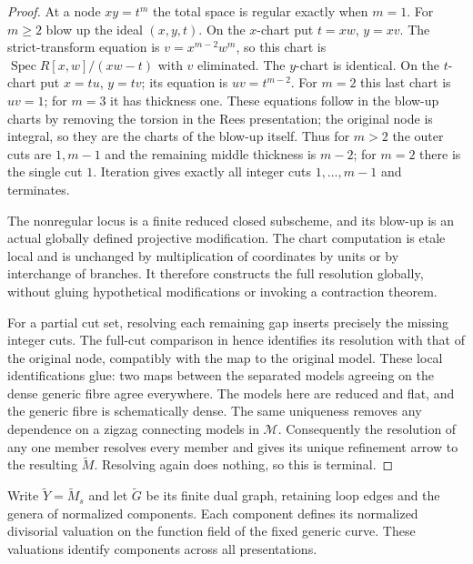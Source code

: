\documentclass[11pt]{article}
\theoremstyle{definition}
\theoremstyle{remark}
\begin{document}
\begin{proof}
At a node $xy=t^m$ the total space is regular exactly when $m=1$.
For $m\geq2$ blow up the ideal $(x,y,t)$.  On the $x$-chart put
$t=xw$, $y=xv$.  The strict-transform equation is
$v=x^{m-2}w^m$, so this chart is $\operatorname{Spec}R[x,w]/(xw-t)$
with $v$ eliminated.  The $y$-chart is identical.  On the $t$-chart
put $x=tu$, $y=tv$; its equation is $uv=t^{m-2}$.
For $m=2$ this last chart is $uv=1$; for $m=3$ it has thickness one.
These equations follow in the blow-up charts by removing the torsion
in the Rees presentation; the original node is integral, so they
are the charts of the blow-up itself.  Thus for $m>2$ the outer cuts
are $1,m-1$ and the remaining middle thickness is $m-2$; for $m=2$
there is the single cut $1$.  Iteration gives exactly all integer cuts
$1,\ldots,m-1$ and terminates.

The nonregular locus is a finite reduced closed subscheme, and its
blow-up is an actual globally defined projective modification.
The chart computation is etale local and is unchanged by multiplication
of coordinates by units or by interchange of branches.  It therefore
constructs the full resolution globally, without gluing hypothetical
modifications or invoking a contraction theorem.

For a partial cut set, resolving each remaining gap inserts precisely
the missing integer cuts.  The full-cut comparison in
\cite[\texttt{prop:cut-models}]{Refinement} hence identifies its
resolution with that of the original node, compatibly with the map
to the original model.  These local identifications glue: two maps
between the separated models agreeing on the dense generic fibre
agree everywhere.  The models here are reduced and flat, and the
generic fibre is schematically dense.  The same uniqueness removes
any dependence on a zigzag connecting models in $\mathscr M$.
Consequently the resolution of any one member resolves every member
and gives its unique refinement arrow to the resulting
$\widetilde M$.  Resolving again does nothing, so this is terminal.
\end{proof}

Write $\widetilde Y=\widetilde M_s$ and let $\widetilde G$ be its
finite dual graph, retaining loop edges and the genera of normalized
components.  Each component defines its normalized divisorial
valuation on the function field of the fixed generic curve.
These valuations identify components across all presentations.
\end{document}
